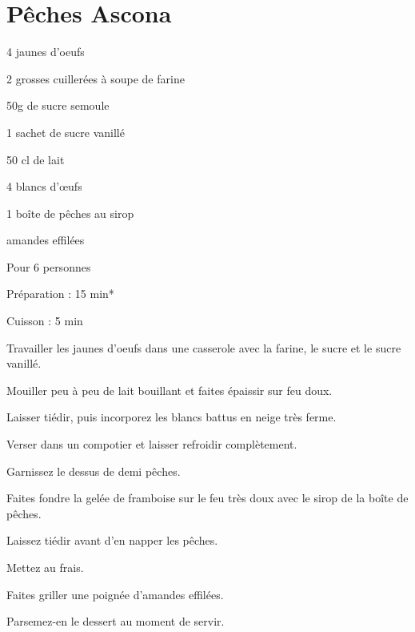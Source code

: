 \section[\normalsize{Pêches Ascona}]{Pêches Ascona}

\begin{ingredients}
\item 4 jaunes d’oeufs
\item 2 grosses cuiller\'ees \`a soupe de farine
\item 50g de sucre semoule 
\item 1 sachet de sucre vanill\'e
\item 50 cl de lait
\item 4 blancs d’œufs
\item 1 boîte de p\^eches au sirop
\item amandes effil\'ees
\end{ingredients}
\begin{infos}
\item Pour 6 personnes
\item Préparation : 15 min*
\item Cuisson : 5 min
\end{infos}
\begin{etapes}
\item Travailler les jaunes d’oeufs dans une casserole avec la farine, le sucre et le sucre vanill\'e.
\item Mouiller peu \`a peu de lait bouillant et faites \'epaissir sur feu doux.
\item Laisser ti\'edir, puis incorporez les blancs battus en neige tr\`es ferme.
\item Verser dans un compotier et laisser refroidir compl\`etement.
\item Garnissez le dessus de demi p\^eches.
\item Faites fondre la gel\'ee de framboise sur le feu tr\`es doux avec le sirop de la boîte de p\^eches.
\item Laissez ti\'edir avant d’en napper les p\^eches.
\item Mettez au frais.
\item Faites griller une poign\'ee d’amandes effil\'ees.
\item Parsemez-en le dessert au moment de servir.
\end{etapes}
\begin{conseils}
\end{conseils}